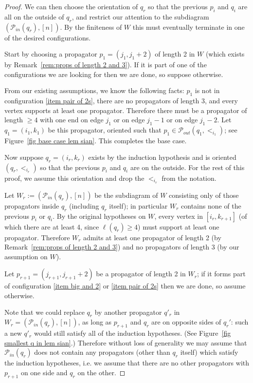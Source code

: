 \documentclass[11pt]{article}
\newcommand{\cP}{\mathcal{P}}
\theoremstyle{remark}
\theoremstyle{definition}
\begin{document}
\begin{proof}
We can then choose the orientation of $q_r$ so that the previous $p_i$ and $q_i$ are all on the outside of $q_r$, and restrict our attention to the subdiagram $(\cP_{in}(q_r),[n])$. By the finiteness of $W$ this must eventually terminate in one of the desired configurations. %

Start by choosing a propagator $p_1 = (j_1,j_1+2)$ of length 2 in $W$ (which exists by Remark~\ref{rem:props of length 2 and 3}).  If it is part of one of the configurations we are looking for then we are done, 
so suppose otherwise. 

From our existing assumptions, we know the following facts: $p_1$ is not in configuration \ref{item pair of 2s}, there are no propagators of length $3$, and every vertex supports at least one propagator.  Therefore there must be a propagator of length $\geq 4$ with one end on edge $j_1$ or on edge $j_1-1$ or on edge $j_1-2$.  Let $q_1 = (i_1, k_1)$ be this propagator, oriented such that $p_1 \in \cP_{out}(q_1,<_{i_1})$; see Figure~\ref{fig base case lem sian}. This completes the base case.

Now suppose $q_{r} = (i_r, k_r)$ exists by the induction hypothesis and is oriented $(q_r, <_{i_r})$ so that the previous $p_i$ and $q_i$ are on the outside. For the rest of this proof, we assume this orientation and drop the $<_{i_r}$ from the notation.

Let $W_r := (\cP_{in}(q_r),[n])$ be the subdiagram of $W$ consisting only of those propagators inside $q_r$ (including $q_r$ itself); in particular $W_r$ contains none of the previous $p_i$ or $q_i$. By the original hypotheses on $W$, every vertex in $[i_r,k_{r+1}]$ (of which there are at least 4, since $\ell(q_r) \geq 4$) must support at least one propagator. Therefore $W_r$ admits at least one propagator of length 2 (by Remark~\ref{rem:props of length 2 and 3}) and no propagators of length $3$ (by our assumption on $W$).

Let $p_{r+1} = (j_{r+1}, j_{r+1}+2)$ be a propagator of length 2 in $W_r$; if it forms part of configuration \ref{item big and 2} or \ref{item pair of 2s}
then we are done, so assume otherwise. 

Note that we could replace $q_r$ by another propagator $q'_{r}$ in $W_r = (\cP_{in}(q_r), [n])$, as long as $p_{r+1}$ and $q_r$ are on opposite sides of $q_r'$: such a new $q'_{r}$ would still satisfy all of the induction hypotheses. (See Figure~\ref{fig smallest q in lem sian}.) Therefore without loss of generality we may assume that $\cP_{in}(q_r)$ does not contain any propagators (other than $q_r$ itself) which satisfy the induction hypotheses, i.e. we assume that there are no other propagators with $p_{r+1}$ on one side and $q_r$ on the other.


\end{proof}
\end{document}
